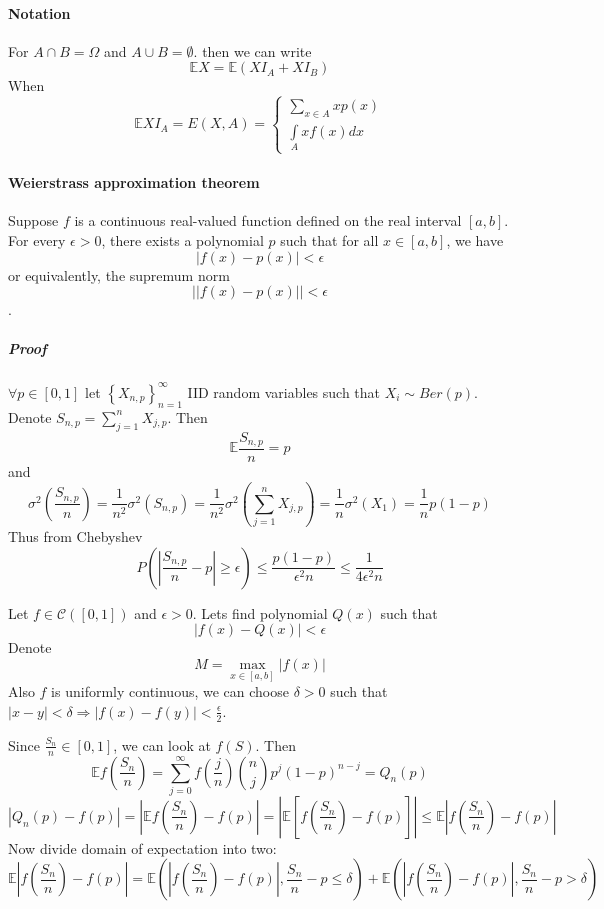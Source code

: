 \paragraph{Notation}
For $A\cap B = \Omega$ and $A \cup B = \emptyset$.
then we can write
$$\mathbb{E} X = \mathbb{E} \left( XI_A + XI_B \right)$$
When
$$\mathbb{E} XI_A = E(X,A) = \begin{cases}
  \sum_{x\in A} xp(x) \\
  \int\limits_{A} xf(x) dx
\end{cases}$$
\paragraph{Weierstrass approximation theorem}
Suppose $f$ is a continuous real-valued function defined on the real interval $[a, b]$. For every $\epsilon > 0$, there exists a polynomial $p$ such that for all $x \in [a, b]$, we have $$|f(x) - p(x) | < \epsilon$$ or equivalently, the  supremum norm $$||f(x) - p(x) || < \epsilon$$.

\subparagraph{Proof}
$\forall p\in [0,1]$ let $\left\{ X_{n,p} \right\}_{n=1}^\infty$ IID random variables such that $X_i \sim Ber(p)$. Denote $S_{n,p} = \sum_{j=1}^n X_{j,p}$. Then
$$\mathbb{E} \frac{S_{n,p}}{n} = p$$
and
$$\sigma^2 \left(\frac{S_{n,p}}{n}\right) = \frac{1}{n^2}\sigma^2 \left(S_{n,p}\right) = \frac{1}{n^2} \sigma^2 \left(\sum_{j=1}^n X_{j,p}\right) = \frac{1}{n} \sigma^2(X_1) = \frac{1}{n} p(1-p)$$
Thus from Chebyshev
$$P \left( \left| \frac{S_{n,p}}{n} - p  \right| \geq \epsilon \right) \leq \frac{p(1-p)}{\epsilon^2 n} \leq \frac{1}{4\epsilon^2 n}$$

Let $f \in \mathcal{C} \left([0,1]\right)$ and $\epsilon > 0$. Lets find polynomial $Q(x)$ such that
$$|f(x) - Q(x) | < \epsilon $$
Denote
$$M = \max\limits_{x\in [a,b]} |f(x)|$$
Also $f$ is uniformly continuous, we can choose $\delta>0$ such that $|x-y|  <\delta \Rightarrow |f(x) - f(y) | < \frac{\epsilon}{2}$.

Since $\frac{S_n}{n} \in [0,1]$, we can look at $f(S)$. Then
$$\mathbb{E} f \left( \frac{S_n}{n} \right) = \sum_{j=0}^\infty f \left( \frac{j}{n} \right) \binom{n}{j} p^j (1-p)^{n-j} = Q_n(p)$$
$$|Q_n(p) - f(p) | = \left| \mathbb{E} f\left( \frac{S_n}{n} \right) - f(p)  \right| = \left| \mathbb{E} \left[f\left( \frac{S_n}{n} \right) - f(p)\right]  \right| \leq  \mathbb{E} \left|  f\left( \frac{S_n}{n} \right) - f(p) \right|  $$
Now divide domain of expectation into two:
$$\mathbb{E} \left|  f\left( \frac{S_n}{n} \right) - f(p) \right|   = \mathbb{E} \left(\left|  f\left( \frac{S_n}{n} \right) - f(p) \right|, \frac{S_n}{n} - p \leq \delta \right) + \mathbb{E} \left(\left|  f\left( \frac{S_n}{n} \right) - f(p) \right|, \frac{S_n}{n} - p > \delta \right) $$

